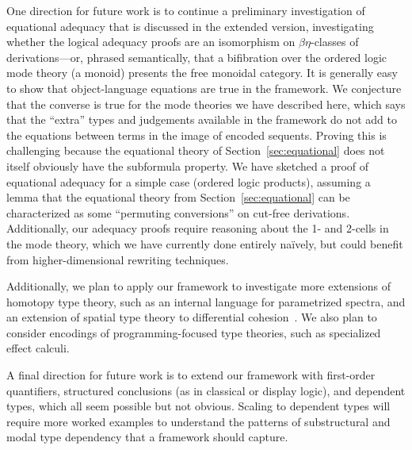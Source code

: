\documentclass[a4paper,USenglish,numberwithinsect]{lipics-v2016}
\begin{document}
One direction for future work is to continue a preliminary investigation
of equational adequacy that is discussed in the extended version,
investigating whether the logical adequacy proofs are an isomorphism on
$\beta\eta$-classes of derivations---or, phrased semantically, that a
bifibration over the ordered logic mode theory (a monoid) presents the
free monoidal category.  It is generally easy to show that
object-language equations are true in the framework.  We conjecture that
the converse is true for the mode theories we have described here, which
says that the ``extra'' types and judgements available in the framework
do not add to the equations between terms in the image of encoded
sequents.  Proving this is challenging because the equational theory of
Section~\ref{sec:equational} does not itself obviously have the
subformula property.  We have sketched a proof of equational adequacy
for a simple case (ordered logic products), assuming a lemma that the
equational theory from Section~\ref{sec:equational} can be characterized
as some ``permuting conversions'' on cut-free derivations.
Additionally, our adequacy proofs require reasoning about the 1- and
2-cells in the mode theory, which we have currently done entirely
na\"ively, but could benefit from higher-dimensional rewriting
techniques.

Additionally, we plan to apply our framework to investigate more
extensions of homotopy type theory, such as an internal language for
parametrized spectra, and an extension of spatial type theory to
differential cohesion~\cite{schreiber13differential}.  We also plan to
consider encodings of programming-focused type theories, such as
specialized effect calculi.

A final direction for future work is to extend our framework with
first-order quantifiers, structured conclusions (as in classical or
display logic), and dependent types, which all seem possible but not
obvious.  Scaling to dependent types will require more worked examples
to understand the patterns of substructural and modal type dependency
that a framework should capture.  



\end{document}
